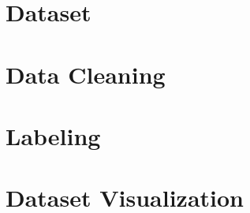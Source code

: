 \documentclass{report}
\begin{document}
  

  \tableofcontents{}
  \printindex{}

  \chapter{Dataset}
    

  \chapter{Data Cleaning}
    

  \chapter{Labeling}
    

  \chapter{Dataset Visualization}
  

  
  
  \printindex
\end{document}
